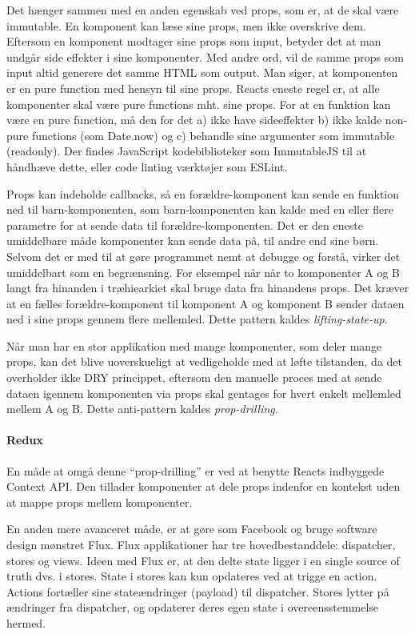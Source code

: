 \documentclass[]{article}
\let\oldparagraph\paragraph
\renewcommand{\paragraph}[1]{\oldparagraph{#1}\mbox{}}
\begin{document}
Det hænger sammen med en anden egenskab ved props, som er, at de skal
være immutable. En komponent kan læse sine props, men ikke overskrive
dem. Eftersom en komponent modtager sine props som input, betyder det at
man undgår side effekter i sine komponenter. Med andre ord, vil de samme
props som input altid generere det samme HTML som output. Man siger, at
komponenten er en pure function med hensyn til sine props. Reacts eneste
regel er, at alle komponenter skal være pure functions mht. sine props.
For at en funktion kan være en pure function, må den for det a) ikke
have sideeffekter b) ikke kalde non-pure functions (som Date.now) og c)
behandle sine argumenter som immutable (readonly). Der findes JavaScript
kodebiblioteker som ImmutableJS til at håndhæve dette, eller code
linting værktøjer som ESLint.

Props kan indeholde callbacks, så en forældre-komponent kan sende en
funktion ned til barn-komponenten, som barn-komponenten kan kalde med en
eller flere parametre for at sende data til forældre-komponenten. Det er
den eneste umiddelbare måde komponenter kan sende data på, til andre end
sine børn. Selvom det er med til at gøre programmet nemt at debugge og
forstå, virker det umiddelbart som en begrænsning. For eksempel når når
to komponenter A og B langt fra hinanden i træhiearkiet skal bruge data
fra hinandens props. Det kræver at en fælles forældre-komponent til
komponent A og komponent B sender dataen ned i sine props gennem flere
mellemled. Dette pattern kaldes \emph{lifting-state-up}.

Når man har en stor applikation med mange komponenter, som deler mange
props, kan det blive uoverskueligt at vedligeholde med at løfte
tilstanden, da det overholder ikke DRY princippet, eftersom den manuelle
proces med at sende dataen igennem komponenten via props skal gentages
for hvert enkelt mellemled mellem A og B. Dette anti-pattern kaldes
\emph{prop-drilling}.

\hypertarget{redux}{%
\paragraph{Redux}\label{redux}}

En måde at omgå denne ``prop-drilling'' er ved at benytte Reacts
indbyggede Context API. Den tillader komponenter at dele props indenfor
en kontekst uden at mappe props mellem komponenter.

En anden mere avanceret måde, er at gøre som Facebook og bruge software
design mønstret Flux. Flux applikationer har tre hovedbestanddele:
dispatcher, stores og views. Ideen med Flux er, at den delte state
ligger i en single source of truth dvs. i stores. State i stores kan kun
opdateres ved at trigge en action. Actions fortæller sine stateændringer
(payload) til dispatcher. Stores lytter på ændringer fra dispatcher, og
opdaterer deres egen state i overeensstemmelse hermed.
\end{document}

